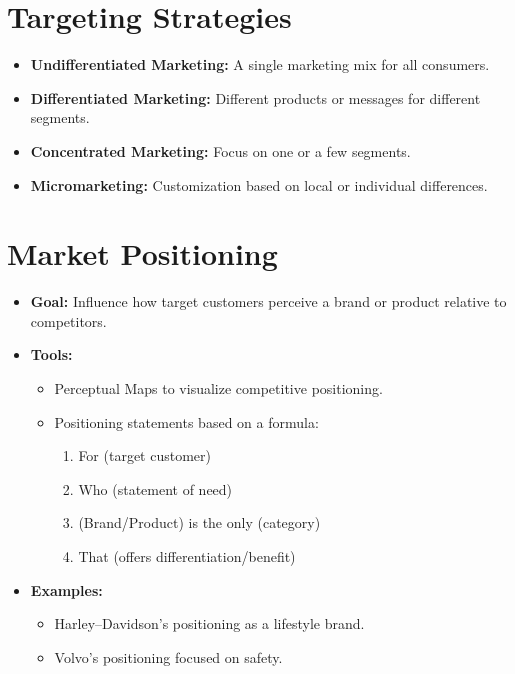 \documentclass[12pt,a4paper]{report}
\begin{document}
\section{Targeting Strategies}
\begin{itemize}
    \item \textbf{Undifferentiated Marketing:} A single marketing mix for all consumers.
    \item \textbf{Differentiated Marketing:} Different products or messages for different segments.
    \item \textbf{Concentrated Marketing:} Focus on one or a few segments.
    \item \textbf{Micromarketing:} Customization based on local or individual differences.
\end{itemize}

\section{Market Positioning}
\begin{itemize}
    \item \textbf{Goal:} Influence how target customers perceive a brand or product relative to competitors.
    \item \textbf{Tools:}
    \begin{itemize}
         \item Perceptual Maps to visualize competitive positioning.
         \item Positioning statements based on a formula:
         \begin{enumerate}[label=\arabic*.]
             \item For (target customer)
             \item Who (statement of need)
             \item (Brand/Product) is the only (category)
             \item That (offers differentiation/benefit)
         \end{enumerate}
    \end{itemize}
    \item \textbf{Examples:} 
         \begin{itemize}
             \item Harley--Davidson’s positioning as a lifestyle brand.
             \item Volvo’s positioning focused on safety.
         \end{itemize}
\end{itemize}
\end{document}
